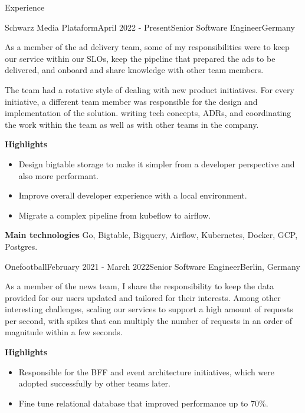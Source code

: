 \documentclass[
	a4paper, %
	10pt, %
]{resume} %
\begin{document}
\begin{rSection}{Experience}

	\begin{rSubsection}{Schwarz Media Plataform}{April 2022 - Present}{Senior Software Engineer}{Germany}
		\item[]
		As a member of the ad delivery team, some of my responsibilities were to keep our service within our SLOs, keep the pipeline that prepared the ads to be delivered,
		and onboard and share knowledge with other team members.

		The team had a rotative style of dealing with new product initiatives. For every initiative, a different team member was responsible for the design and implementation of the solution.
		writing tech concepts, ADRs, and coordinating the work within the team as well as with other teams in the company.

		\textbf{Highlights}
		\begin{itemize}
			\item Design bigtable storage to make it simpler from a developer perspective and also more performant.
			\item Improve overall developer experience with a local environment.
			\item Migrate a complex pipeline from kubeflow to airflow.
		\end{itemize}

		\textbf{Main technologies}
			Go, Bigtable, Bigquery, Airflow, Kubernetes, Docker, GCP, Postgres.

	\end{rSubsection}

	\vspace{1mm}

	\begin{rSubsection}{Onefootball}{February 2021 - March 2022}{Senior Software Engineer}{Berlin, Germany}
		\item[]
		As a member of the news team, I share the responsibility to keep the data provided for our users updated and tailored for their interests.
		Among other interesting challenges, scaling our services to support a high amount of requests per second, with spikes that can multiply the number of requests in an order of magnitude within a few seconds.

		\textbf{Highlights}
		\begin{itemize}
			\item Responsible for the BFF and event architecture initiatives, which were adopted successfully by other teams later.
			\item Fine tune relational database that improved performance up to 70\%.
		\end{itemize}


\end{rSubsection}
\end{rSection}
\end{document}
